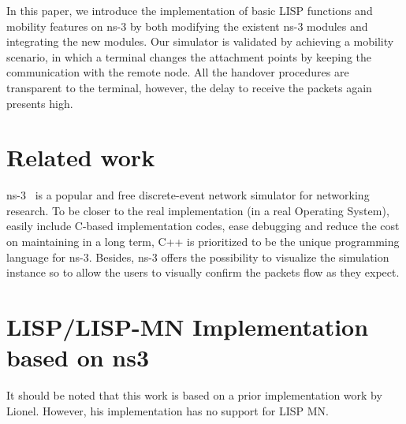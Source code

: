 In this paper, we introduce the implementation of basic LISP functions and mobility features on ns-3 by both modifying the existent ns-3 modules and integrating the new modules. Our simulator is validated by achieving a mobility scenario, in which a terminal changes the attachment points by keeping the communication with the remote node. All the handover procedures are transparent to the terminal, however, the delay to receive the packets again presents high.

\section{Related work}
\label{sec:ns3_related_work}
 ns-3~\cite{ns3} is a popular and free discrete-event network simulator for networking research. To be closer to the real implementation (in a real Operating System), easily include C-based implementation codes, ease debugging and reduce the cost on maintaining in a long term, C++ is prioritized to be the unique programming language for ns-3. Besides, ns-3 offers the possibility to visualize the simulation instance so to allow the users to visually confirm the packets flow as they expect.




\section{LISP/LISP-MN Implementation based on ns3}
\label{sec:ns3_modify}
It should be noted that this work is based on a prior implementation work by Lionel. However, his implementation has no support for LISP MN.

